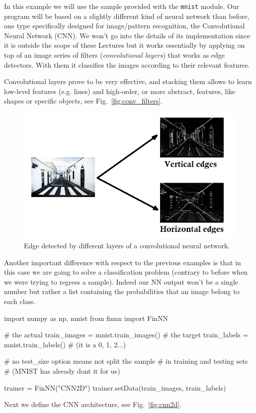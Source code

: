 In this example we will use the sample provided with the \texttt{mnist} module.
Our program will be based on a slightly different kind of neural network
than before, one type specifically designed for image/pattern
recognition, the Convolutional Neural Network (CNN). We won't go into
the details of its implementation since it is outside the scope of these
Lectures but it works essentially by applying on top of an image 
series of filters (\emph{convolutional layers}) that works as edge
detectors. With them it classifies the images according to their
relevant features.

Convolutional layers prove to be very effective, and stacking them allows to
learn low-level features (e.g. lines) and high-order, or more abstract,
features, like shapes or specific objects, see Fig.~\ref{fig:conv_filters}.

\begin{figure}[htb]
	\centering
	\includegraphics[width=1.\textwidth]{figures/edges.jpg}
	\caption{Edge detected by different layers of a convolutional neural network.}
        \label{fig:conv_fitlers}
\end{figure}

Another important difference with respect to the previous examples is
that in this case we are going to solve a classification problem
(contrary to before when we were trying to regress a sample). Indeed our
NN output won't be a single number but rather a list containing the
probabilities that an image belong to each class.

\begin{ipython}
import numpy as np, mnist
from finnn import FinNN

# the actual
train_images = mnist.train_images()
# the target
train_labels = mnist.train_labels() # (it is a 0, 1, 2...)

# no test_size option means not split the sample
# in training and testing sets
# (MNIST has already dont it for us)

trainer = FinNN("CNN2D")
trainer.setData(train_images, train_labels)
\end{ipython}
\noindent
Next we define the CNN architecture, see Fig.~\ref{fig:cnn2d}.

